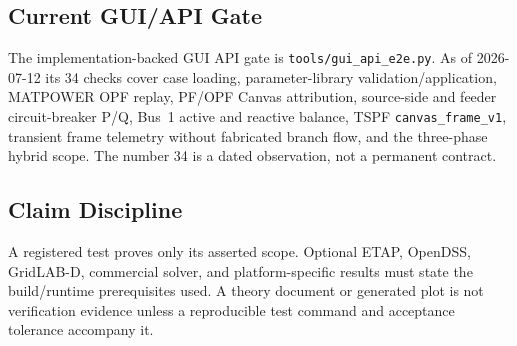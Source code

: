 \subsection{Current GUI/API Gate}

The implementation-backed GUI API gate is
\texttt{tools/gui\_api\_e2e.py}.  As of 2026-07-12 its 34 checks cover case
loading, parameter-library validation/application, MATPOWER OPF replay, PF/OPF
Canvas attribution, source-side and feeder circuit-breaker P/Q, Bus~1 active
and reactive balance, TSPF \texttt{canvas\_frame\_v1}, transient frame
telemetry without fabricated branch flow, and the three-phase hybrid scope.
The number 34 is a dated observation, not a permanent contract.

\subsection{Claim Discipline}

A registered test proves only its asserted scope. Optional ETAP, OpenDSS,
GridLAB-D, commercial solver, and platform-specific results must state the
build/runtime prerequisites used.  A theory document or generated plot is not
verification evidence unless a reproducible test command and acceptance
tolerance accompany it.
